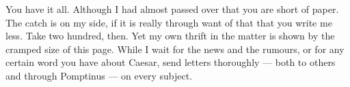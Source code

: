  You have it all. Although I had almost passed over that you are short of paper. The catch is on my side, if it is really through want of that that you write me less. Take two hundred, then. Yet my own thrift in the matter is shown by the cramped size of this page. While I wait for the news and the rumours, or for any certain word you have about Caesar, send letters thoroughly --- both to others and through Pomptinus --- on every subject.
